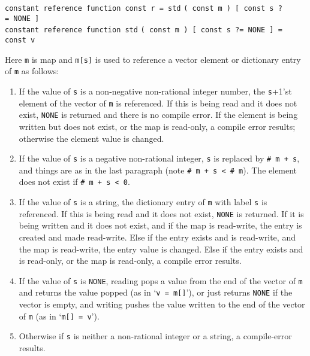 \documentclass[12pt]{article}
\newenvironment{indpar}[1][0.3in]%
	{\begin{list}{}%
		     {\setlength{\itemsep}{0in}%
		      \setlength{\topsep}{0in}%
		      \setlength{\parsep}{1ex}%
		      \setlength{\labelwidth}{#1}%
		      \setlength{\leftmargin}{#1}%
		      \addtolength{\leftmargin}{\labelsep}}%
	 \item}%
	{\end{list}}
\begin{document}
{\tt constant reference function const r = std}
    {\tt ( const m ) [ const s ?=~NONE ]} \\
{\tt constant reference function std}
    {\tt ( const m ) [ const s ?=~NONE ] = const v}
\begin{indpar}
Here {\tt m} is map and {\tt m[s]} is used to reference a
vector element or dictionary entry of {\tt m} as follows:
\begin{enumerate}
\item If the value of {\tt s} is a non-negative non-rational integer number,
the {\tt s}+1'st element
of the vector of {\tt m} is referenced.  If this is being read and
it does not exist, {\tt NONE} is returned and there is no compile
error.
If the element is being written but does not exist, or the map
is read-only, a compile error results; otherwise the element
value is changed.
\item If the value of {\tt s} is a negative non-rational integer,
{\tt s} is replaced by {\tt \# m + s}, and things
are as in the last paragraph (note {\tt \# m + s < \# m}).  The element
does not exist if {\tt \# m + s < 0}.
\item If the value of {\tt s} is a string, the dictionary entry
of {\tt m} with label {\tt s} is referenced.  If this is being read and
it does not exist, {\tt NONE} is returned.  If it is being written and
it does not exist, and if the map is read-write,
the entry is created and made read-write.
Else if the entry exists and is read-write, and the map is read-write,
the entry value is changed.
Else if the entry exists and is read-only, or the map is read-only,
a compile error results.
\item If the value of {\tt s} is {\tt NONE}, reading pops a value from the
end of the vector
of {\tt m} and returns the value popped (as in `{\tt v = m[]}'),
or just returns {\tt NONE} if the vector is empty,
and writing pushes the value written to the end of the vector of {\tt m}
(as in `{\tt m[] = v}').
\item Otherwise if {\tt s} is neither a non-rational integer or a string,
a compile-error results.
\end{enumerate}
\end{indpar}
\end{document}
